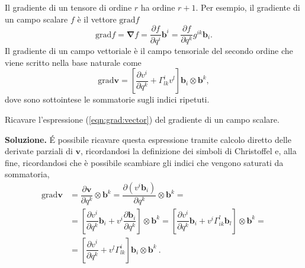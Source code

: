  \noindent
 Il gradiente di un tensore di ordine $r$ ha ordine $r+1$. Per esempio, il gradiente di un campo scalare $f$ è il vettore $\text{grad} f$
 \begin{equation}\label{eqn:grad:scalar}
  \text{grad} f  = \bm{\nabla} f  = \dfrac{\partial f}{\partial q^i} \bm{b}^i = \dfrac{\partial f}{\partial q^k} g^{ik} \bm{b}_i .
 \end{equation}
 Il gradiente di un campo vettoriale è il campo tensoriale del secondo ordine che viene scritto nella base naturale come
 \begin{equation}\label{eqn:grad:vector}
   \text{grad} \bm{v} = \left[ \dfrac{\partial v^i}{\partial q^k} + \Gamma_{lk}^i v^l \right] \bm{b}_i \otimes \bm{b}^k ,
 \end{equation}
dove sono sottointese le sommatorie sugli indici ripetuti.
\begin{exercise} Ricavare l'espressione (\ref{eqn:grad:vector}) del gradiente di un campo scalare.

 \vspace{5pt}\noindent
 \textbf{Soluzione.} \'E possibile ricavare questa espressione tramite calcolo diretto delle derivate parziali di $\bm{v}$, ricordandosi la definizione dei simboli di Christoffel e, alla fine, ricordandosi che è possibile scambiare gli indici che vengono saturati da sommatoria, \vspace{-5pt}
\begin{equation}
\begin{aligned}
    \text{grad} \bm{v} & = \dfrac{\partial \bm{v}}{\partial q^k} \otimes \bm{b}^k %
       = \dfrac{\partial (v^i \bm{b}_i)}{\partial q^k} \otimes \bm{b}^k = \\
     & = \left[ \dfrac{\partial v^i }{\partial q^k} \bm{b}_i +
       v^i \dfrac{\partial \bm{b}_i}{\partial q^k} \right] \otimes \bm{b}^k %
       = \left[ \dfrac{\partial v^i }{\partial q^k} \bm{b}_i +
       v^i \Gamma^{l}_{ik} \bm{b}_l \right] \otimes \bm{b}^k = \\
     & = \left[ \dfrac{\partial v^i }{\partial q^k} +
       v^l \Gamma^{i}_{lk} \right] \bm{b}_i \otimes \bm{b}^k \ . 
\end{aligned}
\end{equation}
\end{exercise}

